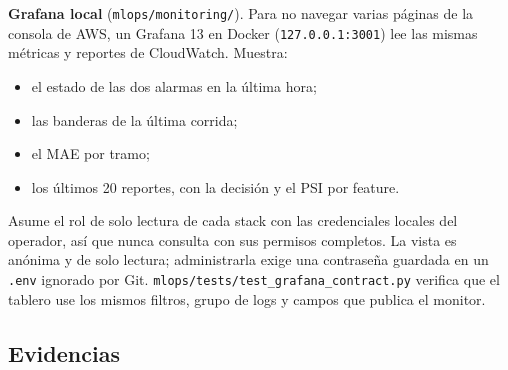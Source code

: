 \textbf{Grafana local} (\texttt{mlops/monitoring/}). Para no navegar varias páginas de la consola de AWS, un Grafana 13 en Docker (\texttt{127.0.0.1:3001}) lee las mismas métricas y reportes de CloudWatch. Muestra:
\begin{itemize}
    \item el estado de las dos alarmas en la última hora;
    \item las banderas de la última corrida;
    \item el MAE por tramo;
    \item los últimos 20 reportes, con la decisión y el PSI por feature.
\end{itemize}
Asume el rol de solo lectura de cada stack con las credenciales locales del operador, así que nunca consulta con sus permisos completos. La vista es anónima y de solo lectura; administrarla exige una contraseña guardada en un \texttt{.env} ignorado por Git. \texttt{mlops/tests/test\_grafana\_contract.py} verifica que el tablero use los mismos filtros, grupo de logs y campos que publica el monitor.

\subsection{Evidencias}


